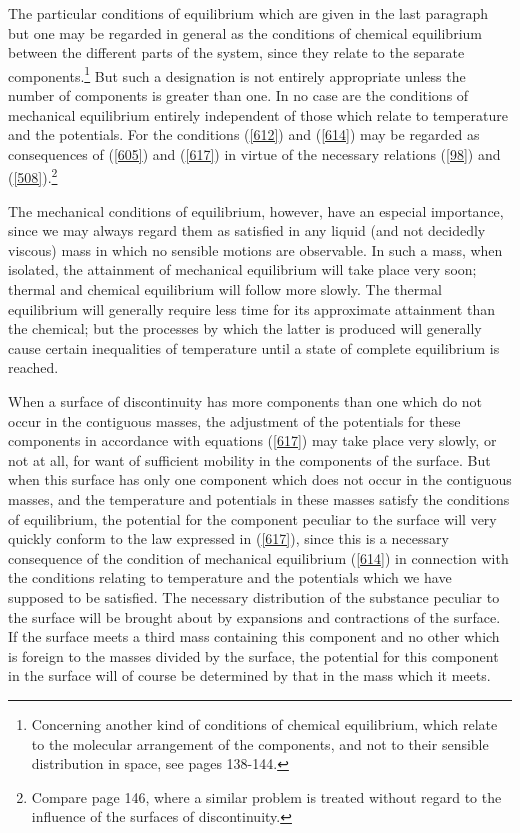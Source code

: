 \documentclass[12pt]{article}
\begin{document}
The particular conditions of equilibrium which are given in the last paragraph but one may be regarded in general as the conditions of chemical equilibrium  between the different parts of the system, since they relate to the separate components.\footnote{Concerning another kind of conditions of chemical equilibrium, which relate to the molecular arrangement of the components, and not to their sensible distribution in space, see pages 138-144.} But such a designation is not entirely appropriate unless the number of components is greater than one. In no case are the conditions of mechanical equilibrium entirely independent of those which relate to temperature and the potentials. For the conditions (\ref{612}) and (\ref{614}) may be regarded as consequences of (\ref{605}) and (\ref{617}) in virtue of the necessary relations (\ref{98}) and (\ref{508}).\footnote{Compare page 146, where a similar problem is treated without regard to the influence of the surfaces of discontinuity.}

The mechanical conditions of equilibrium, however, have an especial importance, since we may always regard them as satisfied in any liquid (and not decidedly viscous) mass in which no sensible motions are observable. In such a mass, when isolated, the attainment of mechanical equilibrium will take place very soon; thermal and chemical equilibrium will follow more slowly. The thermal equilibrium will generally require less time for its approximate attainment than the chemical; but the processes by which the latter is produced will generally cause certain inequalities of temperature until a state of complete equilibrium is reached.

When a surface of discontinuity has more components than one which do not occur in the contiguous masses, the adjustment of the potentials for these components in accordance with equations (\ref{617}) may take place very slowly, or not at all, for want of sufficient mobility in the components of the surface. But when this surface has only one component which does not occur in the contiguous masses, and the temperature and potentials in these masses satisfy the conditions of equilibrium, the potential for the component peculiar to the surface will very quickly conform to the law expressed in (\ref{617}), since this is a necessary consequence of the condition of mechanical equilibrium (\ref{614}) in connection with the conditions relating to temperature and the potentials which we have supposed to be satisfied. The necessary distribution of the substance peculiar to the surface will be brought about by expansions and contractions of the surface. If the surface meets a third mass containing this component and no other which is foreign to the masses divided by the surface, the potential for this component in the surface will of course be determined by that in the mass which it meets.
\end{document}
